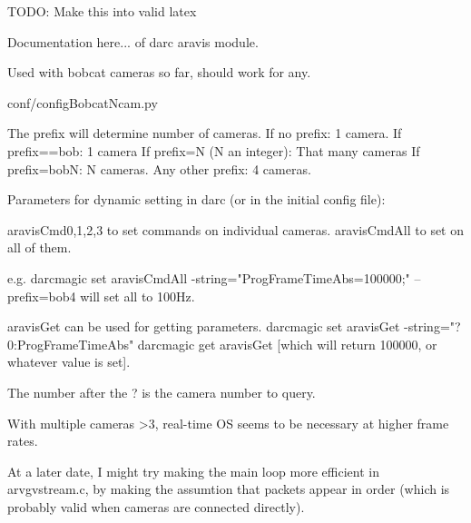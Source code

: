 TODO:  Make this into valid latex

Documentation here... of darc aravis module.

Used with bobcat cameras so far, should work for any.

conf/configBobcatNcam.py



The prefix will determine number of cameras.
If no prefix: 1 camera.
If prefix==bob:  1 camera
If prefix=N (N an integer):  That many cameras
If prefix=bobN:  N cameras.
Any other prefix: 4 cameras.

Parameters for dynamic setting in darc (or in the initial config file):


aravisCmd0,1,2,3 to set commands on individual cameras.
aravisCmdAll to set on all of them.

e.g.
darcmagic set aravisCmdAll -string="ProgFrameTimeAbs=100000;" --prefix=bob4
will set all to 100Hz.

aravisGet can be used for getting parameters.
darcmagic set aravisGet -string="?0:ProgFrameTimeAbs"
darcmagic get aravisGet
[which will return 100000, or whatever value is set].

The number after the ? is the camera number to query.

With multiple cameras >3, real-time OS seems to be necessary at higher frame rates.

At a later date, I might try making the main loop more efficient in arvgvstream.c, by making the assumtion that packets appear in order (which is probably valid when cameras are connected directly).

